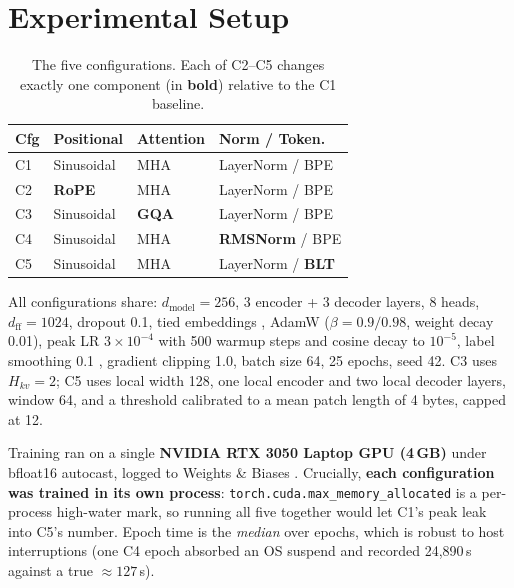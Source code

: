 \documentclass[12pt,a4paper]{article}
\begin{document}
\section{Experimental Setup}
\label{sec:setup}

\begin{table}[t]
\centering\small
\begin{tabular}{llll}
\toprule
\textbf{Cfg} & \textbf{Positional} & \textbf{Attention} & \textbf{Norm / Token.} \\
\midrule
C1 & Sinusoidal      & MHA           & LayerNorm / BPE \\
C2 & \textbf{RoPE}   & MHA           & LayerNorm / BPE \\
C3 & Sinusoidal      & \textbf{GQA}  & LayerNorm / BPE \\
C4 & Sinusoidal      & MHA           & \textbf{RMSNorm} / BPE \\
C5 & Sinusoidal      & MHA           & LayerNorm / \textbf{BLT} \\
\bottomrule
\end{tabular}
\caption{The five configurations. Each of C2--C5 changes exactly one component
(in \textbf{bold}) relative to the C1 baseline.}
\label{tab:configs}
\end{table}

All configurations share: $d_{\text{model}}=256$, 3 encoder + 3 decoder layers,
8 heads, $d_{\text{ff}}=1024$, dropout 0.1, tied embeddings
\citep{press2017tying}, AdamW \citep{loshchilov2019adamw} ($\beta = 0.9/0.98$,
weight decay 0.01), peak LR $3\times10^{-4}$ with 500 warmup steps and cosine
decay to $10^{-5}$, label smoothing 0.1 \citep{szegedy2016labelsmoothing},
gradient clipping 1.0, batch size 64, 25 epochs, seed 42. C3 uses $H_{kv}=2$; C5
uses local width 128, one local encoder and two local decoder layers, window 64,
and a threshold calibrated to a mean patch length of 4 bytes, capped at 12.

Training ran on a single \textbf{NVIDIA RTX 3050 Laptop GPU (4\,GB)} under
bfloat16 autocast, logged to Weights \& Biases \citep{wandb2020}. Crucially,
\textbf{each configuration was trained in its own process}:
\texttt{torch.cuda.max\_memory\_allocated} is a per-process high-water mark, so
running all five together would let C1's peak leak into C5's number. Epoch time
is the \emph{median} over epochs, which is robust to host interruptions (one C4
epoch absorbed an OS suspend and recorded 24{,}890\,s against a true
${\approx}127$\,s).
\end{document}
